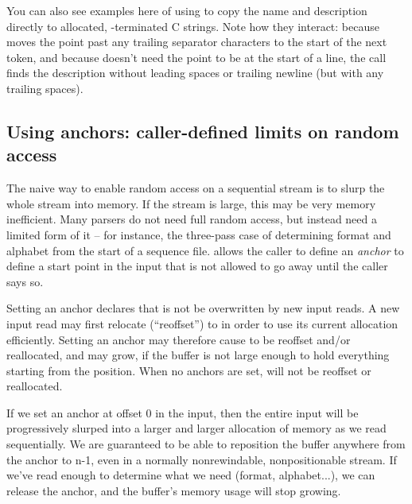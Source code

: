 You can also see examples here of using
 to copy the name and description
directly to allocated, \ccode{\0}-terminated C strings. Note how they
interact: because  moves the
point past any trailing separator characters to the start of the next
token, and because  doesn't need
the point to be at the start of a line, the
 call finds the description
without leading spaces or trailing newline (but with any trailing
spaces).












      





\subsection{Using anchors: caller-defined limits on random access}

The naive way to enable random access on a sequential stream is to
slurp the whole stream into memory. If the stream is large, this may
be very memory inefficient. Many parsers do not need full random
access, but instead need a limited form of it -- for instance, the
three-pass case of determining format and alphabet from the start of a
sequence file.  allows the caller to define an
\emph{anchor} to define a start point in the input that is not allowed
to go away until the caller says so. 

Setting an anchor declares that  is not be
overwritten by new input reads. A new input read may first relocate
(``reoffset'')  to 
in order to use its current allocation efficiently. Setting an anchor
may therefore cause  to be reoffset and/or reallocated, and
 may grow, if the buffer is not large enough to hold
everything starting from the  position. When no anchors
are set,  will not be reoffset or reallocated.

If we set an anchor at offset 0 in the input, then the entire input
will be progressively slurped into a larger and larger allocation of
memory as we read sequentially. We are guaranteed to be able to
reposition the buffer anywhere from the anchor to n-1, even in a
normally nonrewindable, nonpositionable stream. If we've read enough
to determine what we need (format, alphabet...), we can release the
anchor, and the buffer's memory usage will stop growing.

